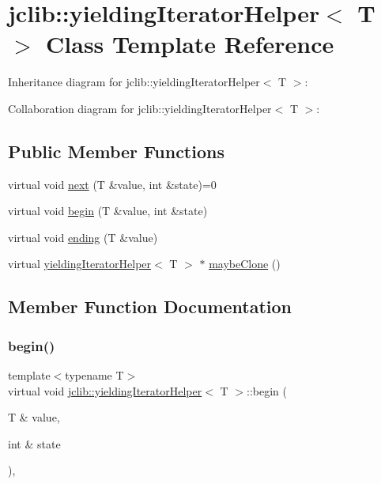 \hypertarget{classjclib_1_1yieldingIteratorHelper}{}\section{jclib\+:\+:yielding\+Iterator\+Helper$<$ T $>$ Class Template Reference}
\label{classjclib_1_1yieldingIteratorHelper}


Inheritance diagram for jclib\+:\+:yielding\+Iterator\+Helper$<$ T $>$\+:


Collaboration diagram for jclib\+:\+:yielding\+Iterator\+Helper$<$ T $>$\+:
\subsection*{Public Member Functions}
\begin{DoxyCompactItemize}
\item 
virtual void \hyperlink{classjclib_1_1yieldingIteratorHelper_a620c17e7eb8ed695e3fb9add01da576d}{next} (T \&value, int \&state)=0
\item 
virtual void \hyperlink{classjclib_1_1yieldingIteratorHelper_ada548ffa73fd843e1d1ebf8e0a78f5c8}{begin} (T \&value, int \&state)
\item 
virtual void \hyperlink{classjclib_1_1yieldingIteratorHelper_a62f77cf3f5376e5997512907460f2d36}{ending} (T \&value)
\item 
virtual \hyperlink{classjclib_1_1yieldingIteratorHelper}{yielding\+Iterator\+Helper}$<$ T $>$ $\ast$ \hyperlink{classjclib_1_1yieldingIteratorHelper_ad3127265c429c4ac282964b7a3b261be}{maybe\+Clone} ()
\end{DoxyCompactItemize}


\subsection{Member Function Documentation}
\mbox{\label{classjclib_1_1yieldingIteratorHelper_ada548ffa73fd843e1d1ebf8e0a78f5c8}} 
\subsubsection{\texorpdfstring{begin()}{begin()}}
{\footnotesize\ttfamily template$<$typename T$>$ \\
virtual void \hyperlink{classjclib_1_1yieldingIteratorHelper}{jclib\+::yielding\+Iterator\+Helper}$<$ T $>$\+::begin (\begin{DoxyParamCaption}\item[{T \&}]{value,  }\item[{int \&}]{state }\end{DoxyParamCaption})\hspace{0.3cm}{\ttfamily [inline]}, {\ttfamily [virtual]}}

